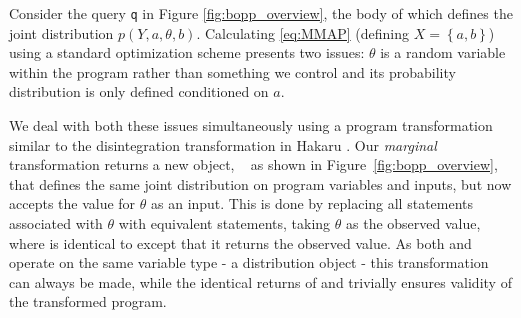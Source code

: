 
Consider the  query \texttt{q} in Figure \ref{fig:bopp_overview}, the body of which defines the joint distribution $p\left(Y,a,\theta,b\right)$.   Calculating \eqref{eq:MMAP} (defining $X=\left\{a,b\right\}$) using a standard optimization scheme presents two issues: $\theta$ is a random variable within the program rather than something we control and its probability distribution is only defined conditioned on $a$.

We deal with both these issues simultaneously using a program transformation similar to the disintegration transformation in Hakaru \citep{zinkov2016composing}. Our \emph{marginal} transformation returns a new \query object, \qmarg~ as shown in Figure~\ref{fig:bopp_overview}, that defines the same joint distribution on program variables and inputs, but now accepts the value for $\theta$ as an input.  This is done by replacing all \sample statements associated with $\theta$ with equivalent \observes statements, taking $\theta$ as the observed value, where \observes is identical to \observe except that it returns the observed value.  As both \sample and \observe operate on the same variable type - a distribution object - this transformation can always be made, while the identical returns of \sample and \observes trivially ensures validity of the transformed program.  





